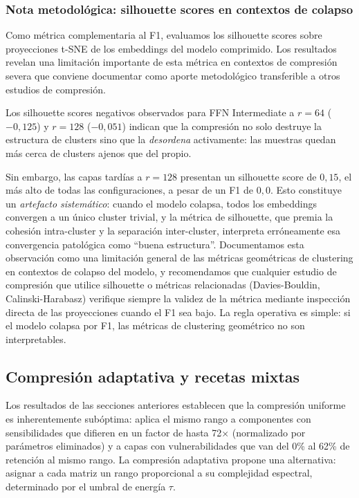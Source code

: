 \subsubsection{Nota metodológica: silhouette scores en contextos de colapso}
\label{sec:silhouette-caveat}

Como métrica complementaria al F1, evaluamos los silhouette scores sobre
proyecciones t-SNE de los embeddings del modelo comprimido. Los resultados
revelan una limitación importante de esta métrica en contextos de
compresión severa que conviene documentar como aporte metodológico
transferible a otros estudios de compresión.

Los silhouette scores negativos observados para FFN Intermediate a $r=64$
($-0{,}125$) y $r=128$ ($-0{,}051$) indican que la compresión no solo
destruye la estructura de clusters sino que la \emph{desordena}
activamente: las muestras quedan más cerca de clusters ajenos que del
propio.

Sin embargo, las capas tardías a $r=128$ presentan un silhouette score de
$0{,}15$, el más alto de todas las configuraciones, a pesar de un F1
de $0{,}0$. Esto constituye un \emph{artefacto sistemático}: cuando el
modelo colapsa, todos los embeddings convergen a un único cluster trivial,
y la métrica de silhouette, que premia la cohesión intra-cluster y la
separación inter-cluster, interpreta erróneamente esa convergencia
patológica como ``buena estructura''. Documentamos esta observación como
una limitación general de las métricas geométricas de clustering en
contextos de colapso del modelo, y recomendamos que cualquier estudio de
compresión que utilice silhouette o métricas relacionadas (Davies-Bouldin,
Calinski-Harabasz) verifique siempre la validez de la métrica mediante
inspección directa de las proyecciones cuando el F1 sea bajo. La regla
operativa es simple: si el modelo colapsa por F1, las métricas de
clustering geométrico no son interpretables.



\subsection{Compresión adaptativa y recetas mixtas}
\label{sec:compresion-adaptativa}

Los resultados de las secciones anteriores establecen que la compresión uniforme es
inherentemente subóptima: aplica el mismo rango a componentes con sensibilidades que
difieren en un factor de hasta 72$\times$ (normalizado por parámetros eliminados) y
a capas con vulnerabilidades que van del 0\% al 62\% de retención al mismo rango. La compresión adaptativa propone una alternativa:
asignar a cada matriz un rango proporcional a su complejidad espectral, determinado por
el umbral de energía $\tau$.

